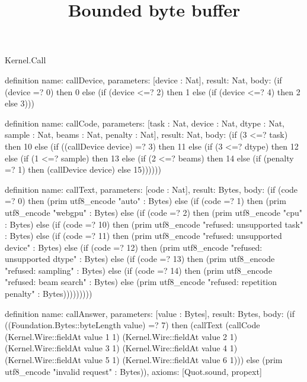 \begin{lexlean}{Kernel.Call}
\title{Bounded byte buffer}
\begin{semanticmodule}
definition{
  name: callDevice,
  parameters: [device : Nat],
  result: Nat,
  body: (if (device =? 0) then 0 else (if (device <=? 2) then 1 else (if (device <=? 4) then 2 else 3)))
}

definition{
  name: callCode,
  parameters: [task : Nat, device : Nat, dtype : Nat, sample : Nat, beams : Nat, penalty : Nat],
  result: Nat,
  body: (if (3 <=? task) then 10 else (if ((callDevice device) =? 3) then 11 else (if (3 <=? dtype) then 12 else (if (1 <=? sample) then 13 else (if (2 <=? beams) then 14 else (if (penalty =? 1) then (callDevice device) else 15))))))
}

definition{
  name: callText,
  parameters: [code : Nat],
  result: Bytes,
  body: (if (code =? 0) then (prim utf8_encode "auto" : Bytes) else (if (code =? 1) then (prim utf8_encode "webgpu" : Bytes) else (if (code =? 2) then (prim utf8_encode "cpu" : Bytes) else (if (code =? 10) then (prim utf8_encode "refused: unsupported task" : Bytes) else (if (code =? 11) then (prim utf8_encode "refused: unsupported device" : Bytes) else (if (code =? 12) then (prim utf8_encode "refused: unsupported dtype" : Bytes) else (if (code =? 13) then (prim utf8_encode "refused: sampling" : Bytes) else (if (code =? 14) then (prim utf8_encode "refused: beam search" : Bytes) else (prim utf8_encode "refused: repetition penalty" : Bytes)))))))))
}

definition{
  name: callAnswer,
  parameters: [value : Bytes],
  result: Bytes,
  body: (if ((Foundation.Bytes::byteLength value) =? 7) then (callText (callCode (Kernel.Wire::fieldAt value 1 1) (Kernel.Wire::fieldAt value 2 1) (Kernel.Wire::fieldAt value 3 1) (Kernel.Wire::fieldAt value 4 1) (Kernel.Wire::fieldAt value 5 1) (Kernel.Wire::fieldAt value 6 1))) else (prim utf8_encode "invalid request" : Bytes)),
  axioms: [Quot.sound, propext]
}
\end{semanticmodule}
\end{lexlean}
